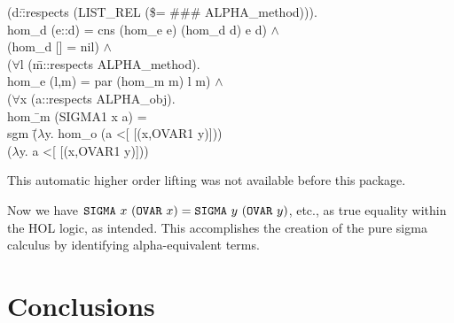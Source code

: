 \documentclass[envcountsame,runningheads]{llncs}
\begin{document}
{\begin{tabbing}
\>\>\>\>(d:\=:respects (LIST\_REL (\$= \#\#\# ALPHA\_method))). \\
\>\>\>\>\> hom\_d (e::d) = cns (hom\_e e) (hom\_d d) e d) $\wedge$ \\
\>\>\>(hom\_d [] = nil) $\wedge$ \\
\>\>\>($\forall$l (\=m::respects ALPHA\_method). \\
\>\>\>\>   hom\_e (l,m) = par (hom\_m m) l m) $\wedge$ \\
\>\>\>($\forall$x (a::respects ALPHA\_obj). \\
\>\>\>\>   hom\=\_m (SIGMA1 x a) = \\
\>\>\>\>\>    sgm \=($\lambda$y. hom\_o (a <[ [(x,OVAR1 y)])) \\
\>\>\>\>\>\>      ($\lambda$y. a <[ [(x,OVAR1 y)]))
\end{tabbing}}
This automatic higher order lifting was not available before this package.

Now we have
$\mbox{\tt SIGMA}\ x\ (\mbox{\tt OVAR}\ x) =
 \mbox{\tt SIGMA}\ y\ (\mbox{\tt OVAR}\ y)$, etc., as true equality
within the HOL logic, as intended.
This accomplishes the creation of the pure sigma calculus
by identifying alpha-equivalent terms.


%
\section{Conclusions}
%
\label{conclusions}
\end{document}
